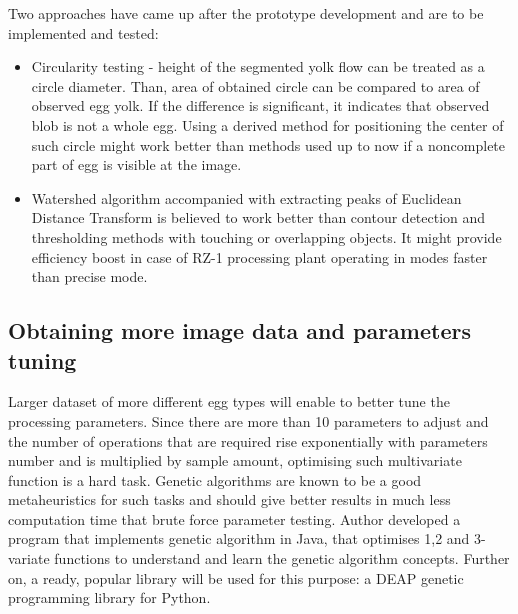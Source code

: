 \documentclass[12pt,twoside,a4paper]{article}
\begin{document}
Two approaches have came up after the prototype development and are to be implemented and tested:

\begin{itemize}
\item Circularity testing - height of the segmented yolk flow can be treated as a circle diameter. Than, area of obtained circle can be compared to area of observed egg yolk. If the difference is significant, it indicates that observed blob is not a whole egg.
Using a derived method for positioning the center of such circle might work better than methods used up to now if a noncomplete part of egg is visible at the image.
\item Watershed algorithm accompanied with extracting peaks of Euclidean Distance Transform is believed to work better than contour detection and thresholding methods with touching or overlapping objects.
It might provide efficiency boost in case of RZ-1 processing plant operating in modes faster than precise mode.\cite{watershed}
\end{itemize}
\newpage
\subsection{Obtaining more image data and parameters tuning}

Larger dataset of more different egg types will enable to better tune the processing parameters.
Since there are more than 10 parameters to adjust and the number of operations that are required rise exponentially with parameters number and is multiplied by sample amount, optimising such multivariate function is a hard task.
Genetic algorithms are known to be a good metaheuristics for such tasks and should give better results in much less computation time that brute force parameter testing.
Author developed a program that implements genetic algorithm in Java, that optimises 1,2 and 3-variate functions to understand and learn the genetic algorithm concepts.
Further on, a ready, popular library will be used for this purpose: a DEAP genetic programming library for Python.
\end{document}
